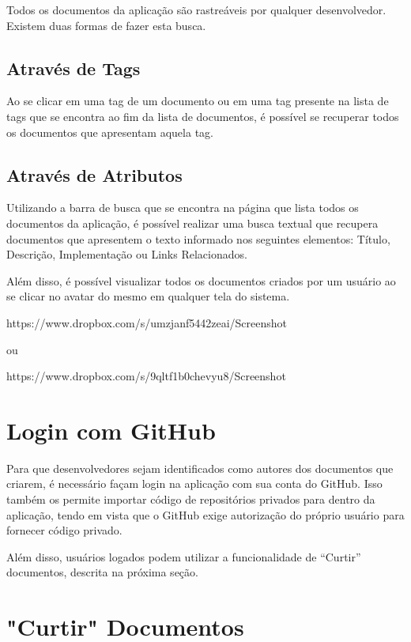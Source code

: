 Todos os documentos da aplicação são rastreáveis por qualquer desenvolvedor. Existem duas formas de fazer esta busca.

\subsection{Através de Tags}

Ao se clicar em uma tag de um documento ou em uma tag presente na lista de tags que se encontra ao fim da lista de documentos, é possível se recuperar todos os documentos que apresentam aquela tag.

\subsection{Através de Atributos}

Utilizando a barra de busca que se encontra na página que lista todos os documentos da aplicação, é possível realizar uma busca textual que recupera documentos que apresentem o texto informado nos seguintes elementos: Título, Descrição, Implementação ou Links Relacionados.

Além disso, é possível visualizar todos os documentos criados por um usuário ao se clicar no avatar do mesmo em qualquer tela do sistema.

https://www.dropbox.com/s/umzjanf5442zeai/Screenshot%

ou

https://www.dropbox.com/s/9qltf1b0chevyu8/Screenshot%

\section{Login com GitHub}

Para que desenvolvedores sejam identificados como autores dos documentos que criarem, é necessário façam login na aplicação com sua conta do GitHub. Isso também os permite importar código de repositórios privados para dentro da aplicação, tendo em vista que o GitHub exige autorização do próprio usuário para fornecer código privado.

Além disso, usuários logados podem utilizar a funcionalidade de ``Curtir'' documentos, descrita na próxima seção.

\section{"Curtir" Documentos}

